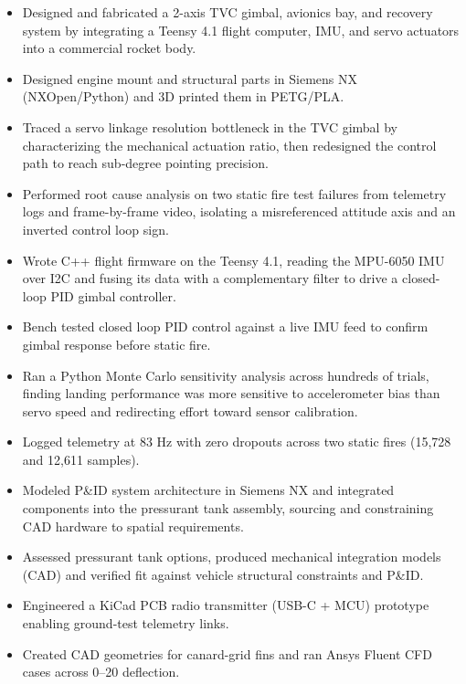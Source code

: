 \begin{itemize}
  \item Designed and fabricated a 2-axis TVC gimbal, avionics bay, and recovery system by integrating a Teensy 4.1 flight computer, IMU, and servo actuators into a commercial rocket body.
  \item Designed engine mount and structural parts in Siemens NX (NXOpen/Python) and 3D printed them in PETG/PLA.
  \item Traced a servo linkage resolution bottleneck in the TVC gimbal by characterizing the mechanical actuation ratio, then redesigned the control path to reach sub-degree pointing precision.
  \item Performed root cause analysis on two static fire test failures from telemetry logs and frame-by-frame video, isolating a misreferenced attitude axis and an inverted control loop sign.
  \item Wrote C++ flight firmware on the Teensy 4.1, reading the MPU-6050 IMU over I2C and fusing its data with a complementary filter to drive a closed-loop PID gimbal controller.
  \item Bench tested closed loop PID control against a live IMU feed to confirm gimbal response before static fire.
  \item Ran a Python Monte Carlo sensitivity analysis across hundreds of trials, finding landing performance was more sensitive to accelerometer bias than servo speed and redirecting effort toward sensor calibration.
  \item Logged telemetry at 83 Hz with zero dropouts across two static fires (15,728 and 12,611 samples).
\end{itemize}
\entrygap

\begin{itemize}
  \item Modeled P\&ID system architecture in Siemens NX and integrated components into the pressurant tank assembly, sourcing and constraining CAD hardware to spatial requirements.
  \item Assessed pressurant tank options, produced mechanical integration models (CAD) and verified fit against vehicle structural constraints and P\&ID.
  \item Engineered a KiCad PCB radio transmitter (USB-C + MCU) prototype enabling ground-test telemetry links.
  \item Created CAD geometries for canard-grid fins and ran Ansys Fluent CFD cases across 0--20\textdegree{} deflection.
\end{itemize}
\entrygap

